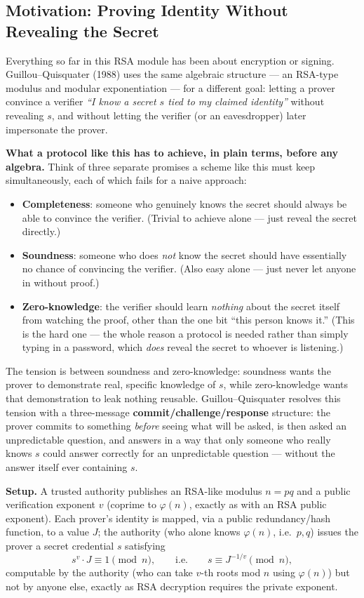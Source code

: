 \subsection{Motivation: Proving Identity Without Revealing the Secret}

Everything so far in this RSA module has been about encryption or signing. Guillou--Quisquater (1988) uses the same algebraic structure — an RSA-type modulus and modular exponentiation — for a different goal: letting a prover convince a verifier \emph{``I know a secret $s$ tied to my claimed identity''} without revealing $s$, and without letting the verifier (or an eavesdropper) later impersonate the prover.

\medskip\noindent\textbf{What a protocol like this has to achieve, in plain terms, before any algebra.} Think of three separate promises a scheme like this must keep simultaneously, each of which fails for a naive approach:
\begin{itemize}
\item \textbf{Completeness}: someone who genuinely knows the secret should always be able to convince the verifier. (Trivial to achieve alone — just reveal the secret directly.)
\item \textbf{Soundness}: someone who does \emph{not} know the secret should have essentially no chance of convincing the verifier. (Also easy alone — just never let anyone in without proof.)
\item \textbf{Zero-knowledge}: the verifier should learn \emph{nothing} about the secret itself from watching the proof, other than the one bit ``this person knows it.'' (This is the hard one — the whole reason a protocol is needed rather than simply typing in a password, which \emph{does} reveal the secret to whoever is listening.)
\end{itemize}
The tension is between soundness and zero-knowledge: soundness wants the prover to demonstrate real, specific knowledge of $s$, while zero-knowledge wants that demonstration to leak nothing reusable. Guillou--Quisquater resolves this tension with a three-message \textbf{commit/challenge/response} structure: the prover commits to something \emph{before} seeing what will be asked, is then asked an unpredictable question, and answers in a way that only someone who really knows $s$ could answer correctly for an unpredictable question — without the answer itself ever containing $s$.

\medskip\noindent\textbf{Setup.} A trusted authority publishes an RSA-like modulus $n = pq$ and a public verification exponent $v$ (coprime to $\varphi(n)$, exactly as with an RSA public exponent). Each prover's identity is mapped, via a public redundancy/hash function, to a value $J$; the authority (who alone knows $\varphi(n)$, i.e.\ $p,q$) issues the prover a secret credential $s$ satisfying
\[
s^{v} \cdot J \equiv 1 \pmod n, \qquad \text{i.e.}\qquad s \equiv J^{-1/v} \pmod n,
\]
computable by the authority (who can take $v$-th roots mod $n$ using $\varphi(n)$) but not by anyone else, exactly as RSA decryption requires the private exponent.

